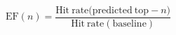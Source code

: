 \begin{equation}
    \mathrm{EF}(n) = \frac{\mathrm{Hit\: rate (predicted\: top - }n)}{\mathrm{Hit\: rate (baseline)}}
\end{equation}




